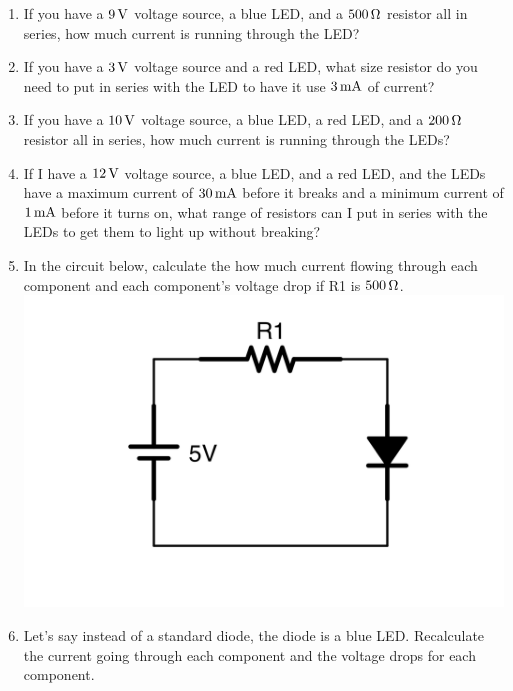 
\begin{enumerate}
\item If you have a $9\,\si{\volt}$ voltage source, a blue LED, and a $500\,\si{\ohm}$ resistor all in series, how much current is running through the LED?
\item If you have a $3\,\si{\volt}$ voltage source and a red LED, what size resistor do you need to put in series with the LED to have it use $3\,\si{\milli\ampere}$ of current?
\item If you have a $10\,\si{\volt}$ voltage source, a blue LED, a red LED, and a $200\,\si{\ohm}$ resistor all in series, how much current is running through the LEDs?
\item If I have a $12\,\si{\volt}$ voltage source, a blue LED, and a red LED, and the LEDs have a maximum current of $30\,\si{\milli\ampere}$ before it breaks and a minimum current of $1\,\si{\milli\ampere}$ before it turns on, what range of resistors can I put in series with the LEDs to get them to light up without breaking?
\item In the circuit below, calculate the how much current flowing through each component and each component's voltage drop if R1 is $500\,\si{\ohm}$. \\ \includegraphics[scale=0.08]{DiodeApplyEx1.png}
\item Let's say instead of a standard diode, the diode is a blue LED.  Recalculate the current going through each component and the voltage drops for each component.

\end{enumerate}
